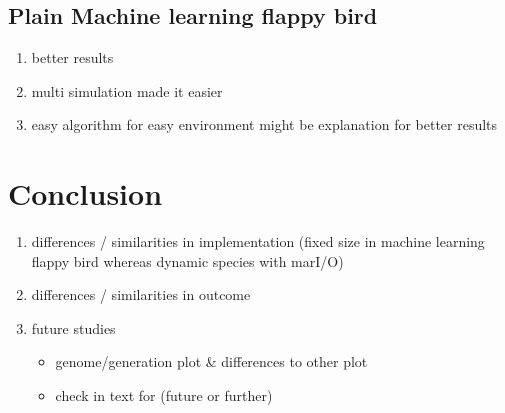 		
		
		\subsection{Plain Machine learning flappy bird}
			\begin{enumerate}
				\item better results
				\item multi simulation made it easier
				\item easy algorithm for easy environment might be explanation for better results
			\end{enumerate}
	
	
	\section{Conclusion}
		\label{sec:system:conclusion}
		\begin{enumerate}
			\item differences / similarities in implementation (fixed size in machine learning flappy bird whereas dynamic species with marI/O)
			\item differences / similarities in outcome
			\item future studies
				\begin{itemize}
					\item genome/generation plot \& differences to other plot
					\item check in text for (future or further)
				\end{itemize}
		\end{enumerate}

